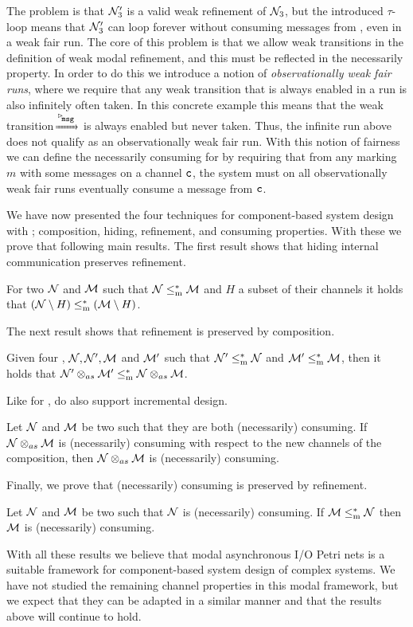 The problem is that $\mathcal{N}_3'$ is a valid weak refinement of $\mathcal{N}_3$, but the introduced $\tau$-loop means that $\mathcal{N}_3'$ can loop forever without consuming messages from , even in a weak fair run. The core of this problem is that we allow weak transitions in the definition of weak modal refinement, and this must be reflected in the necessarily property. In order to do this we introduce a notion of \emph{observationally weak fair runs}, where we require that any weak transition that is always enabled in a run is also infinitely often taken. In this concrete example this means that the weak transition $\lmustw{\transition{\inact{msg}}}$ is always enabled but never taken. Thus, the infinite run above does not qualify as an observationally weak fair run. With this notion of fairness we can define the necessarily consuming for \MAIOPNs by requiring that from any marking $m$ with some messages on a channel $\mathtt{c}$, the system must on all observationally weak fair runs eventually consume a message from $\mathtt{c}$.

We have now presented the four techniques for component-based system design with \MAIOPNs; composition,
hiding,
refinement, and
consuming properties.
With these we prove that following main results. The first result shows that hiding internal communication preserves refinement.

\begin{result}
    For two \MAIOPNs $\mathcal{N}$ and $\mathcal{M}$ such that $\mathcal{N} \le^*_\mathrm m \mathcal{M}$ and $H$ a subset of their channels it holds that $(\mathcal{N} \setminus H) \le^*_\mathrm m (\mathcal{M} \setminus H)$.
\end{result}

The next result shows that refinement is preserved by composition.

\begin{result}
    Given four \MAIOPNs, $\mathcal{N},\mathcal{N}',\mathcal{M}$ and $\mathcal{M}'$ such that $\mathcal{N}' \le^*_\mathrm m \mathcal{N}$ and $\mathcal{M}'\le^*_\mathrm m \mathcal{M}$, then it holds that $\mathcal{N}' \otimes_{as} \mathcal{M}' \le^*_\mathrm m \mathcal{N} \otimes_{as} \mathcal{M}$. 
\end{result}

Like for \AIOPNs, \MAIOPNs do also support incremental design.
\begin{result}
    Let $\mathcal{N}$ and $\mathcal{M}$ be two \MAIOPNs such that they are both (necessarily) consuming. If $\mathcal{N} \otimes_{as} \mathcal{M}$ is (necessarily) consuming with respect to the new channels of the composition, then $\mathcal{N} \otimes_{as} \mathcal{M}$ is (necessarily) consuming.
\end{result}

Finally, we prove that (necessarily) consuming is preserved by refinement.

\begin{result}
    Let $\mathcal{N}$ and $\mathcal{M}$ be two \MAIOPNs such that $\mathcal{N}$ is (necessarily) consuming. If $\mathcal{M} \le^*_\mathrm m \mathcal{N}$ then $\mathcal{M}$ is (necessarily) consuming.
\end{result}

With all these results we believe that modal asynchronous I/O Petri nets is a suitable framework for component-based system design of complex systems. We have not studied the remaining channel properties in this modal framework, but we expect that they can be adapted in a similar manner and that the results above will continue to hold.